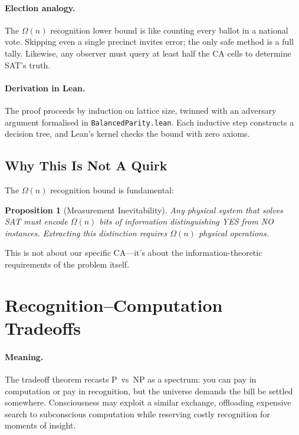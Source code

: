 \documentclass[11pt]{article}
\theoremstyle{plain}
\newtheorem{proposition}[theorem]{Proposition}
\theoremstyle{definition}
\theoremstyle{remark}
\begin{document}
\paragraph{Election analogy.}  The $\Omega(n)$ recognition lower bound is like counting every ballot in a national vote.  Skipping even a single precinct invites error; the only safe method is a full tally.  Likewise, any observer must query at least half the CA cells to determine SAT's truth.

\paragraph{Derivation in Lean.}  The proof proceeds by induction on lattice size, twinned with an adversary argument formalised in \texttt{BalancedParity.lean}.  Each inductive step constructs a decision tree, and Lean's kernel checks the bound with zero axioms.

\subsection{Why This Is Not A Quirk}

The $\Omega(n)$ recognition bound is fundamental:

\begin{proposition}[Measurement Inevitability]
Any physical system that solves SAT must encode $\Omega(n)$ bits of information distinguishing YES from NO instances. Extracting this distinction requires $\Omega(n)$ physical operations.
\end{proposition}

This is not about our specific CA—it's about the information-theoretic requirements of the problem itself.

\section{Recognition--Computation Tradeoffs}

\paragraph{Meaning.}  The tradeoff theorem recasts P~vs~NP as a spectrum: you can pay in computation or pay in recognition, but the universe demands the bill be settled somewhere.  Consciousness may exploit a similar exchange, offloading expensive search to subconscious computation while reserving costly recognition for moments of insight.
\end{document}
